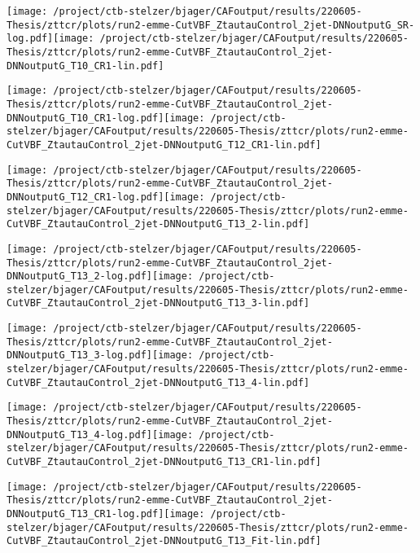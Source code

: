 \documentclass{article}
\begin{document}
\texttt{[image: /project/ctb-stelzer/bjager/CAFoutput/results/220605-Thesis/zttcr/plots/run2-emme-CutVBF\_ZtautauControl\_2jet-DNNoutputG\_SR-log.pdf]}\texttt{[image: /project/ctb-stelzer/bjager/CAFoutput/results/220605-Thesis/zttcr/plots/run2-emme-CutVBF\_ZtautauControl\_2jet-DNNoutputG\_T10\_CR1-lin.pdf]}

\texttt{[image: /project/ctb-stelzer/bjager/CAFoutput/results/220605-Thesis/zttcr/plots/run2-emme-CutVBF\_ZtautauControl\_2jet-DNNoutputG\_T10\_CR1-log.pdf]}\texttt{[image: /project/ctb-stelzer/bjager/CAFoutput/results/220605-Thesis/zttcr/plots/run2-emme-CutVBF\_ZtautauControl\_2jet-DNNoutputG\_T12\_CR1-lin.pdf]}

\texttt{[image: /project/ctb-stelzer/bjager/CAFoutput/results/220605-Thesis/zttcr/plots/run2-emme-CutVBF\_ZtautauControl\_2jet-DNNoutputG\_T12\_CR1-log.pdf]}\texttt{[image: /project/ctb-stelzer/bjager/CAFoutput/results/220605-Thesis/zttcr/plots/run2-emme-CutVBF\_ZtautauControl\_2jet-DNNoutputG\_T13\_2-lin.pdf]}

\texttt{[image: /project/ctb-stelzer/bjager/CAFoutput/results/220605-Thesis/zttcr/plots/run2-emme-CutVBF\_ZtautauControl\_2jet-DNNoutputG\_T13\_2-log.pdf]}\texttt{[image: /project/ctb-stelzer/bjager/CAFoutput/results/220605-Thesis/zttcr/plots/run2-emme-CutVBF\_ZtautauControl\_2jet-DNNoutputG\_T13\_3-lin.pdf]}

\texttt{[image: /project/ctb-stelzer/bjager/CAFoutput/results/220605-Thesis/zttcr/plots/run2-emme-CutVBF\_ZtautauControl\_2jet-DNNoutputG\_T13\_3-log.pdf]}\texttt{[image: /project/ctb-stelzer/bjager/CAFoutput/results/220605-Thesis/zttcr/plots/run2-emme-CutVBF\_ZtautauControl\_2jet-DNNoutputG\_T13\_4-lin.pdf]}

\texttt{[image: /project/ctb-stelzer/bjager/CAFoutput/results/220605-Thesis/zttcr/plots/run2-emme-CutVBF\_ZtautauControl\_2jet-DNNoutputG\_T13\_4-log.pdf]}\texttt{[image: /project/ctb-stelzer/bjager/CAFoutput/results/220605-Thesis/zttcr/plots/run2-emme-CutVBF\_ZtautauControl\_2jet-DNNoutputG\_T13\_CR1-lin.pdf]}

\texttt{[image: /project/ctb-stelzer/bjager/CAFoutput/results/220605-Thesis/zttcr/plots/run2-emme-CutVBF\_ZtautauControl\_2jet-DNNoutputG\_T13\_CR1-log.pdf]}\texttt{[image: /project/ctb-stelzer/bjager/CAFoutput/results/220605-Thesis/zttcr/plots/run2-emme-CutVBF\_ZtautauControl\_2jet-DNNoutputG\_T13\_Fit-lin.pdf]}
\end{document}
